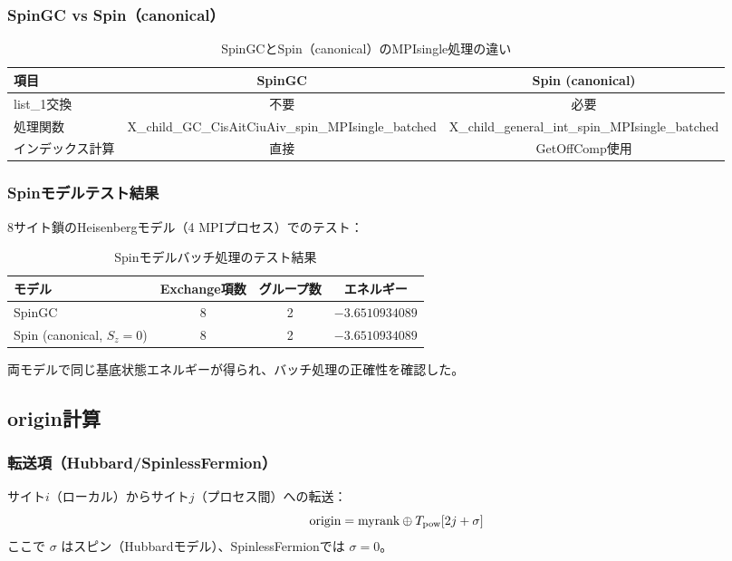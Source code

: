 \documentclass[11pt,a4paper]{article}
\begin{document}
\subsubsection{SpinGC vs Spin（canonical）}

\begin{table}[h]
\centering
\begin{tabular}{lcc}
\toprule
項目 & SpinGC & Spin (canonical) \\
\midrule
list\_1交換 & 不要 & 必要 \\
処理関数 & X\_child\_GC\_CisAitCiuAiv\_spin\_MPIsingle\_batched &
           X\_child\_general\_int\_spin\_MPIsingle\_batched \\
インデックス計算 & 直接 & GetOffComp使用 \\
\bottomrule
\end{tabular}
\caption{SpinGCとSpin（canonical）のMPIsingle処理の違い}
\end{table}

\subsubsection{Spinモデルテスト結果}

8サイト鎖のHeisenbergモデル（4 MPIプロセス）でのテスト：

\begin{table}[h]
\centering
\begin{tabular}{lccc}
\toprule
モデル & Exchange項数 & グループ数 & エネルギー \\
\midrule
SpinGC & 8 & 2 & $-3.6510934089$ \\
Spin (canonical, $S_z=0$) & 8 & 2 & $-3.6510934089$ \\
\bottomrule
\end{tabular}
\caption{Spinモデルバッチ処理のテスト結果}
\end{table}

両モデルで同じ基底状態エネルギーが得られ、バッチ処理の正確性を確認した。

\subsection{origin計算}

\subsubsection{転送項（Hubbard/SpinlessFermion）}

サイト$i$（ローカル）からサイト$j$（プロセス間）への転送：
\begin{equation}
  \text{origin} = \text{myrank} \oplus T_{\rm pow}[2j + \sigma]
\end{equation}
ここで $\sigma$ はスピン（Hubbardモデル）、SpinlessFermionでは $\sigma=0$。
\end{document}
